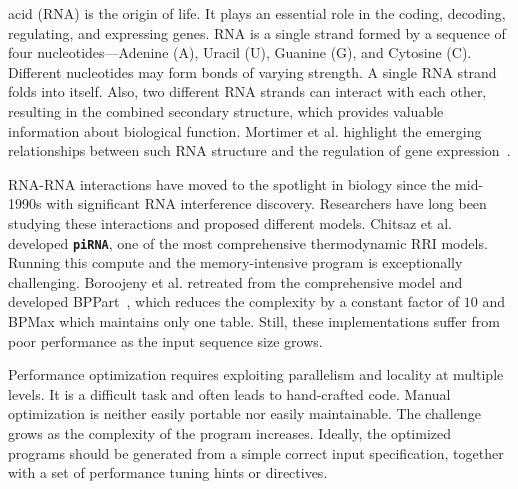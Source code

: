  acid (RNA) is the origin of life. It plays an essential role in the coding, decoding, regulating, and expressing genes. RNA is a single strand formed by a sequence of four nucleotides---Adenine (A), Uracil (U), Guanine (G), and Cytosine (C). Different nucleotides may form bonds of varying strength. A single RNA strand folds into itself. Also, two different RNA strands can interact with each other, resulting in the combined secondary structure, which provides valuable information about biological function. Mortimer et al. highlight the emerging relationships between such RNA structure and the regulation of gene expression~\cite{Mortimer_2014}.

RNA-RNA interactions have moved to the spotlight in biology since the mid-1990s with significant RNA interference discovery. Researchers have long been studying these interactions and proposed different models. Chitsaz et al.\cite{Chitsaz2009} developed \textbf{\texttt{piRNA}}, one of the most comprehensive thermodynamic RRI models. Running this compute and the memory-intensive program is exceptionally challenging.
Boroojeny et al. \cite{EbrahimpourBoroojeny2021} retreated
from the comprehensive model and developed BPPart~\cite{EbrahimpourBoroojeny2021}, which reduces the complexity by a constant factor of  $10$ and BPMax which maintains only one table. Still, these implementations suffer from poor performance as the input
sequence size grows.

Performance optimization requires exploiting parallelism and locality at multiple levels. It is a difficult task and often leads to hand-crafted code. Manual optimization is neither easily portable nor easily maintainable. The challenge grows as the complexity of the program increases. Ideally, the optimized programs should be generated from a simple correct input specification, together with a set of performance tuning hints or directives.

